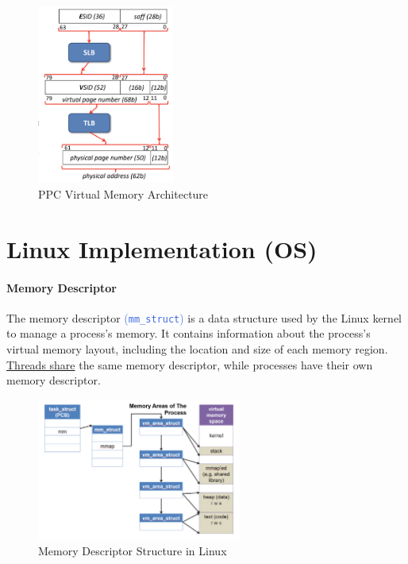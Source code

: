 \documentclass[openany,12pt]{book}
\newcommand{\code}[1]{\texttt{#1}}
\newcommand{\blue}[1]{\textcolor{RoyalBlue}{#1}}
\begin{document}
\begin{figure}[H]
\centering
\includegraphics[width=0.4\textwidth]{PPC-Caches.png}
\caption{PPC Virtual Memory Architecture}
\label{fig:PPC-virtual-memory}
\end{figure}













\section*{Linux Implementation (OS)}


\paragraph{Memory Descriptor} The memory descriptor \blue{(\code{mm\_struct})} is a data structure used by the Linux kernel to manage a process's memory. It contains information about the process's virtual memory layout, including the location and size of each memory region. \ul{Threads share} the same memory descriptor, while processes have their own memory descriptor.  

\begin{figure}[H]
\centering
\includegraphics[width=0.6\textwidth]{memory_struct.png}
\caption{Memory Descriptor Structure in Linux}
\label{fig:memory-descriptor}
\end{figure}
\end{document}
